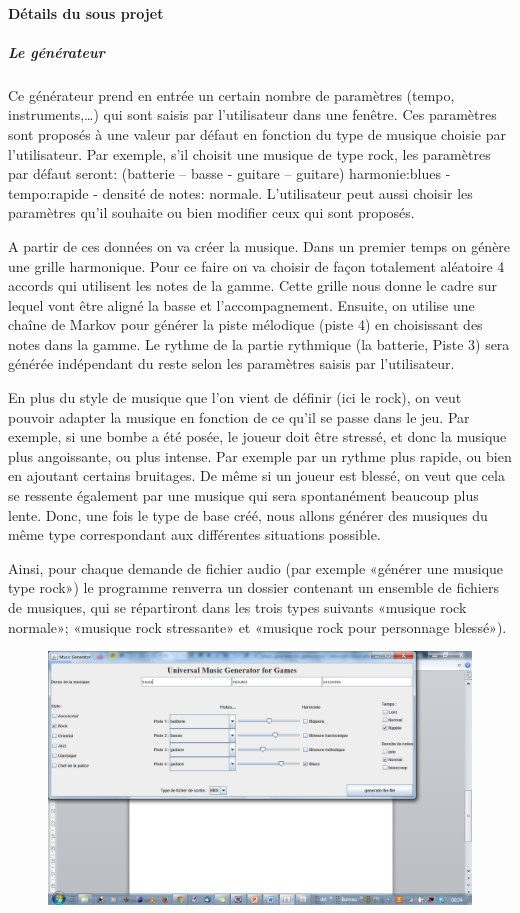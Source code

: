 \documentclass[a4paper,10pt]{article}
\begin{document}
\paragraph{Détails du sous projet}
\subparagraph{Le générateur}
Ce générateur prend en entrée un certain nombre de paramètres (tempo, instruments,…)  qui sont saisis par l’utilisateur dans une fenêtre. Ces paramètres sont proposés à une valeur par défaut en fonction du type de musique choisie par l’utilisateur. Par exemple, s’il choisit une musique de type rock, les paramètres par défaut seront: {(batterie – basse - guitare – guitare)  harmonie:blues - tempo:rapide - densité de notes: normale}. 
L’utilisateur peut aussi choisir les paramètres qu’il souhaite ou bien modifier ceux qui sont proposés. 

A partir de ces données on va créer la musique. 
Dans un premier temps  on génère une grille harmonique. Pour ce faire on va choisir de façon totalement aléatoire 4 accords qui utilisent les notes de la gamme. Cette grille  nous donne le cadre sur  lequel vont être aligné la basse et l’accompagnement.
Ensuite, on utilise une chaîne de Markov pour générer  la piste mélodique (piste 4)  en choisissant des notes dans la gamme. Le rythme de la partie rythmique (la batterie,  Piste 3)  sera générée indépendant du reste selon les paramètres saisis par l’utilisateur. 


En plus du style de musique que l’on vient de définir (ici le rock), on veut pouvoir adapter la musique en fonction de ce qu’il se passe dans le jeu. Par exemple, si une bombe a été posée, le joueur doit être stressé, et donc la musique plus angoissante, ou plus intense. Par exemple par un rythme plus rapide, ou bien en ajoutant certains bruitages. De même si un joueur est blessé, on veut que cela se ressente également par une musique qui sera spontanément beaucoup plus lente.  
Donc, une fois le type de base créé, nous allons générer des musiques du même type correspondant aux différentes situations possible. 

Ainsi, pour chaque demande de fichier audio (par exemple «générer une musique type rock») le programme renverra un dossier contenant un ensemble de fichiers de musiques, qui se répartiront dans les trois types suivants «musique rock normale»; «musique rock stressante» et «musique rock pour personnage blessé»).
\begin{figure}[h]
\centering
\includegraphics[width = \linewidth]{./musique.png}
\end{figure}
\end{document}
